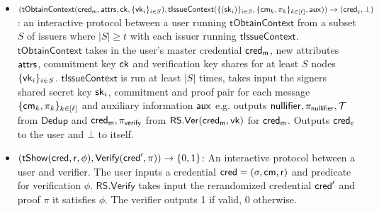 \begin{definition}[tSIRIS]
\begin{itemize}
    \item $(\mathsf{tObtainContext}(\mathsf{cred_m}, \mathsf{attrs}, \mathsf{ck}, \{\mathsf{vk}_i\}_{i \in S}), \mathsf{tIssueContext}(\{(\mathsf{sk}_i)\}_{i \in S}, \{\mathsf{cm}_k, \pi_k\}_{k \in [\ell]}, \mathsf{aux})) \to (\mathsf{cred_c}, \bot)$: an interactive protocol between a user running $\mathsf{tObtainContext}$ from a subset $S$ of issuers where $|S| \geq t$ with each issuer running $\mathsf{tIssueContext}$.
    $\mathsf{tObtainContext}$ takes in the user's master credential $\mathsf{cred_m}$, new attributes $\mathsf{attrs}$, commitment key $\mathsf{ck}$ and verification key shares for at least $S$ nodes $\{\mathsf{vk}_i\}_{i \in S}$. $\mathsf{tIssueContext}$ is run at least $|S|$ times, takes input the signers shared secret key $\mathsf{sk}_i$, commitment and proof pair for each message  $\{\mathsf{cm}_k, \pi_k\}_{k \in [\ell]}$ and auxiliary information $\mathsf{aux}$ e.g. outputs $\mathsf{nullifier}, \pi_{\mathsf{nullifier}},\mathcal{T}$ from $\mathsf{Dedup}$ and $\mathsf{cred_m}, \pi_{\mathsf{verify}}$ from $\mathsf{RS.Ver}(\mathsf{cred_m}, \mathsf{vk})$ for $\mathsf{cred_m}$. Outputs $\mathsf{cred_c}$ to the user and $\bot$ to itself.

    \item $(\mathsf{tShow}(\mathsf{cred}, \mathsf{r}, \phi), \mathsf{Verify}(\mathsf{cred}', \pi)) \to \{0,1\}$: An interactive protocol between a user and verifier. The user inputs a credential $\mathsf{cred} = (\sigma, \mathsf{cm}, \mathsf{r})$ and predicate for verification $\phi$. $\mathsf{RS.Verify}$ takes input the rerandomized credential $\mathsf{cred}'$ and proof $\pi$ it satisfies $\phi$. The verifier outputs 1 if valid, 0 otherwise.
\end{itemize}
\end{definition}




